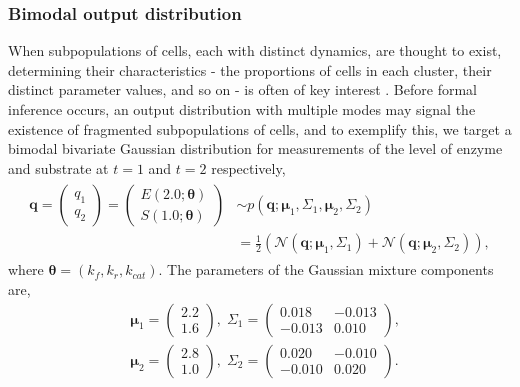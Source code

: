 \subsubsection{Bimodal output distribution}
When subpopulations of cells, each with distinct dynamics, are thought to exist, determining their characteristics - the proportions of cells in each cluster, their distinct parameter values, and so on - is often of key interest \cite{hasenauer2011identification,loos2018hierarchical}. Before formal inference occurs, an output distribution with multiple modes may signal the existence of fragmented subpopulations of cells, and to exemplify this, we target a bimodal bivariate Gaussian distribution for measurements of the level of enzyme and substrate at $t=1$ and $t=2$ respectively,
%
\begin{equation}
\begin{gathered}\begin{aligned}
\boldsymbol{q} = \begin{pmatrix} q_1 \\ q_2 \end{pmatrix}
 = \begin{pmatrix} E(2.0; \boldsymbol{\theta}) \\ S(1.0; \boldsymbol{\theta}) \end{pmatrix}
&  \sim
p(\boldsymbol{q}; \boldsymbol{\mu}_1,\Sigma_1, \boldsymbol{\mu}_2, \Sigma_2) \\
&= \frac{1}{2}\left(\mathcal{N}(\boldsymbol{q}; \boldsymbol{\mu}_1,\Sigma_1)
+ \mathcal{N}(\boldsymbol{q}; \boldsymbol{\mu}_2,\Sigma_2)\right),
\end{aligned}\end{gathered}
\end{equation}
%
where $\boldsymbol{\theta}=(k_f,k_r,k_{cat})$. The parameters of the Gaussian mixture components are,
%
\begin{equation*}
\begin{aligned}
&\boldsymbol{\mu}_1=\begin{pmatrix} 2.2 \\ 1.6 \end{pmatrix} , \; \Sigma_1
                   =\begin{pmatrix} 0.018 & -0.013 \\ -0.013 & 0.010 \end{pmatrix}, \\
&\boldsymbol{\mu}_2=\begin{pmatrix} 2.8 \\ 1.0 \end{pmatrix}, \; \Sigma_2
                   =\begin{pmatrix} 0.020 & -0.010 \\ -0.010 & 0.020 \end{pmatrix}.
\end{aligned}
\end{equation*}
